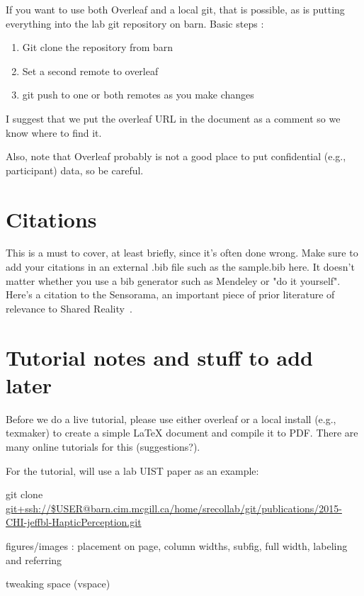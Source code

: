 \documentclass{sigchi}
\begin{document}
If you want to use both Overleaf and a local git, that is possible, as is putting everything into the lab git repository on barn.
Basic steps :

\begin{enumerate}
\item Git clone the repository from barn
\item Set a second remote to overleaf
\item git push to one or both remotes as you make changes
\end{enumerate}

I suggest that we put the overleaf URL in the document as a comment so we know where to find it.

Also, note that Overleaf probably is not a good place to put confidential (e.g., participant) data, so be careful.

\section{Citations}

This is a must to cover, at least briefly, since it's often done wrong.
Make sure to add your citations in an external .bib file such as the sample.bib here.
It doesn't matter whether you use a bib generator such as Mendeley or "do it yourself". 
Here's a citation to the Sensorama, an important piece of prior literature of relevance to Shared Reality~\cite{heilig:sensorama}.

\section{Tutorial notes and stuff to add later}

Before we do a live tutorial, please use either overleaf or a local install (e.g., texmaker) to create a simple LaTeX document and compile it to PDF.
There are many online tutorials for this (suggestions?).

For the tutorial, will use a lab UIST paper as an example:

git clone \url{git+ssh://$USER@barn.cim.mcgill.ca/home/srecollab/git/publications/2015-CHI-jeffbl-HapticPerception.git}

figures/images : placement on page, column widths, subfig, full width, labeling and referring

tweaking space (vspace)
\end{document}
